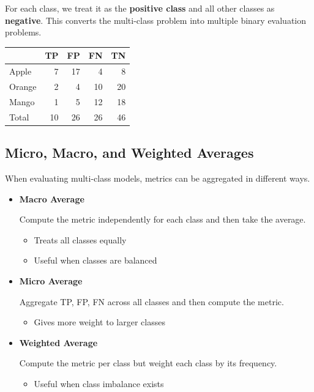 \documentclass[10pt,a4paper]{article}
\begin{document}
	For each class, we treat it as the \textbf{positive class} and all other classes as \textbf{negative}.
	This converts the multi-class problem into multiple binary evaluation problems.

	\begin{center}
		\begin{tabular}{lrrrr}
			\toprule
			& TP & FP & FN & TN \\
			\midrule
			Apple & 7 & 17 & 4 & 8 \\
			Orange & 2 & 4 & 10 & 20 \\
			Mango & 1 & 5 & 12 & 18 \\
			\midrule
			Total & 10 & 26 & 26 & 46 \\
			\bottomrule
		\end{tabular}
	\end{center}

	\subsection{Micro, Macro, and Weighted Averages}

	When evaluating multi-class models, metrics can be aggregated in different ways.

	\begin{itemize}

		\item \textbf{Macro Average}

		Compute the metric independently for each class and then take the average.

		\begin{itemize}
			\item Treats all classes equally
			\item Useful when classes are balanced
		\end{itemize}

		\item \textbf{Micro Average}

		Aggregate TP, FP, FN across all classes and then compute the metric.

		\begin{itemize}
			\item Gives more weight to larger classes
		\end{itemize}

		\item \textbf{Weighted Average}

		Compute the metric per class but weight each class by its frequency.

		\begin{itemize}
			\item Useful when class imbalance exists
		\end{itemize}

	\end{itemize}
\end{document}
